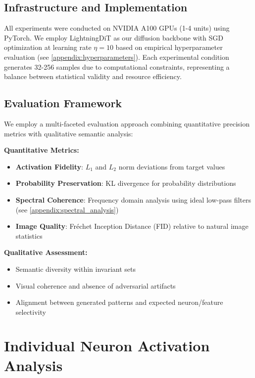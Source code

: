 \documentclass[licencjacka,en]{pracamgr}
\begin{document}
\subsection{Infrastructure and Implementation}

All experiments were conducted on NVIDIA A100 GPUs (1-4 units) using PyTorch. We employ LightningDiT as our diffusion backbone with SGD optimization at learning rate $\eta = 10$ based on empirical hyperparameter evaluation (see \cref{appendix:hyperparameters}). Each experimental condition generates 32-256 samples due to computational constraints, representing a balance between statistical validity and resource efficiency.

\subsection{Evaluation Framework}

We employ a multi-faceted evaluation approach combining quantitative precision metrics with qualitative semantic analysis:

\textbf{Quantitative Metrics:}
\begin{itemize}
\item \textbf{Activation Fidelity}: $L_1$ and $L_2$ norm deviations from target values
\item \textbf{Probability Preservation}: KL divergence for probability distributions
\item \textbf{Spectral Coherence}: Frequency domain analysis using ideal low-pass filters (see \cref{appendix:spectral_analysis})
\item \textbf{Image Quality}: Fréchet Inception Distance (FID) relative to natural image statistics
\end{itemize}

\textbf{Qualitative Assessment:}
\begin{itemize}
\item Semantic diversity within invariant sets
\item Visual coherence and absence of adversarial artifacts
\item Alignment between generated patterns and expected neuron/feature selectivity
\end{itemize}

\section{Individual Neuron Activation Analysis}
\end{document}
